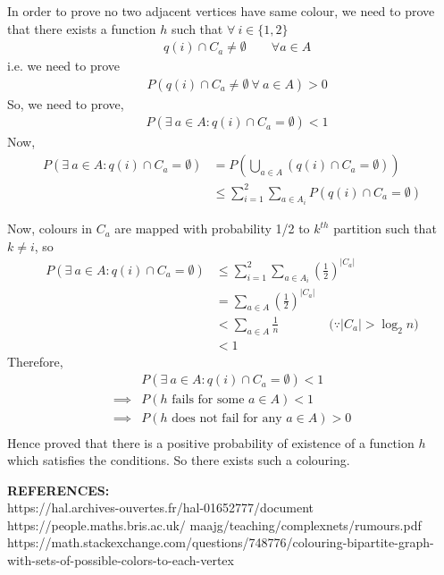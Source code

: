 \documentclass[12pt]{article}
\begin{document}
\begin{solution}
    In order to prove no two adjacent vertices have same colour, we need to prove that there exists a function $h$ such that $\forall \: i \in \{1,2\}$
    \begin{align*}
      &q(i) \cap C_a \neq \emptyset \quad\quad \forall a\in A  
     \end{align*}
     i.e. we need to prove
     \begin{align*}
      &P(q(i) \cap C_a \neq \emptyset \:\forall\: a \in A) > 0
    \end{align*}
    So, we need to prove,
    \begin{align*}
      &P(\exists \:a \in A : q(i) \cap C_a = \emptyset) < 1
    \end{align*}
    Now,
      \begin{align*}
        P\left(\exists \:a \in A : q(i) \cap C_a = \emptyset\right) &=P\left(\bigcup_{a \in A}(q(i) \cap C_a = \emptyset)\right) \\
        &\leq\sum_{i=1}^{2}\sum_{a \in A_i} P\left(q(i) \cap C_a = \emptyset\right) 
         \end{align*}
        
        Now, colours in $C_a$ are mapped with probability 1/2 to $k^{th}$ partition such that $k \neq i$, so
       \begin{align*}P\left(\exists \:a \in A : q(i) \cap C_a = \emptyset\right) &\leq\sum_{i=1}^{2}\sum_{a \in A_i} \left(\frac{1}{2}\right)^{|C_a|}\\
        &=\sum_{a \in A} \left(\frac{1}{2}\right)^{|C_a|}\\
        &<\sum_{a \in A} \frac{1}{n} \quad\quad\quad\quad \textrm {$(\because |C_a|>\log_2 n$)}\\
        &<1
      \end{align*}
    Therefore,
    \begin{align*}
      &P\left(\exists \:a \in A : q(i) \cap C_a = \emptyset\right) <1\\
      \implies&P(h\text{ fails for some } a\in A)< 1\\
      \implies&P(h\text{ does not fail for any } a\in A)>0\\
    \end{align*}
    Hence proved that there is a positive probability of existence of a function $h$ which satisfies the conditions. So there exists such a colouring.
  \end{solution}
  
\textbf{REFERENCES:}\\

https://hal.archives-ouvertes.fr/hal-01652777/document\\

https://people.maths.bris.ac.uk/ maajg/teaching/complexnets/rumours.pdf\\

https://math.stackexchange.com/questions/748776/colouring-bipartite-graph-with-sets-of-possible-colors-to-each-vertex




  
\end{document}

